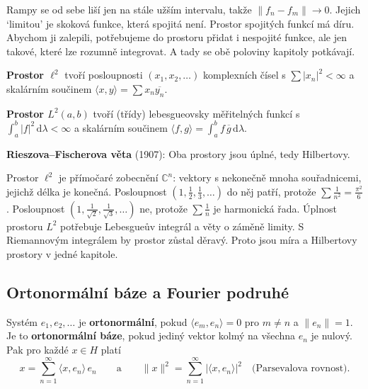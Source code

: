 Rampy se od sebe liší jen na stále užším intervalu, takže $\|f_n - f_m\|\to 0$. Jejich `limitou' je skoková funkce, která spojitá není. Prostor spojitých funkcí má díru. Abychom ji zalepili, potřebujeme do prostoru přidat i nespojité funkce, ale jen takové, které lze rozumně integrovat. A tady se obě poloviny kapitoly potkávají.

\begin{definitionbox}
  \textbf{Prostor $\ell^2$} tvoří posloupnosti $(x_1, x_2, \dots)$ komplexních čísel s $\sum|x_n|^2 < \infty$ a skalárním součinem $\langle x, y\rangle = \sum x_n\overline{y_n}$.

  \vspace{0.2cm}

  \textbf{Prostor $L^2(a, b)$} tvoří (třídy) lebesgueovsky měřitelných funkcí s $\int_a^b|f|^2\,\mathrm{d}\lambda < \infty$ a skalárním součinem $\langle f, g\rangle = \int_a^b f\,\overline{g}\,\mathrm{d}\lambda$.

  \vspace{0.2cm}

  \textbf{Rieszova--Fischerova věta} (1907): Oba prostory jsou úplné, tedy Hilbertovy.
\end{definitionbox}

Prostor $\ell^2$ je přímočaré zobecnění $\mathbb{C}^n$: vektory s nekonečně mnoha souřadnicemi, jejichž délka je konečná. Posloupnost $(1, \frac{1}{2}, \frac{1}{3}, \dots)$ do něj patří, protože $\sum\frac{1}{n^2} = \frac{\pi^2}{6}$. Posloupnost $(1, \frac{1}{\sqrt{2}}, \frac{1}{\sqrt{3}}, \dots)$ ne, protože $\sum\frac{1}{n}$ je harmonická řada. Úplnost prostoru $L^2$ potřebuje Lebesgueův integrál a věty o záměně limity. S Riemannovým integrálem by prostor zůstal děravý. Proto jsou míra a Hilbertovy prostory v jedné kapitole.

\subsection{Ortonormální báze a Fourier podruhé}

\begin{definitionbox}
  Systém $e_1, e_2, \ldots$ je \textbf{ortonormální}, pokud $\langle e_m, e_n\rangle = 0$ pro $m\neq n$ a $\|e_n\| = 1$. Je to \textbf{ortonormální báze}, pokud jediný vektor kolmý na všechna $e_n$ je nulový. Pak pro každé $x\in H$ platí
  \begin{equation*}
    x = \sum_{n=1}^{\infty}\langle x, e_n\rangle\,e_n\qquad\text{a}\qquad\|x\|^2 = \sum_{n=1}^{\infty}|\langle x, e_n\rangle|^2\quad\text{(Parsevalova rovnost)}.
  \end{equation*}
\end{definitionbox}

